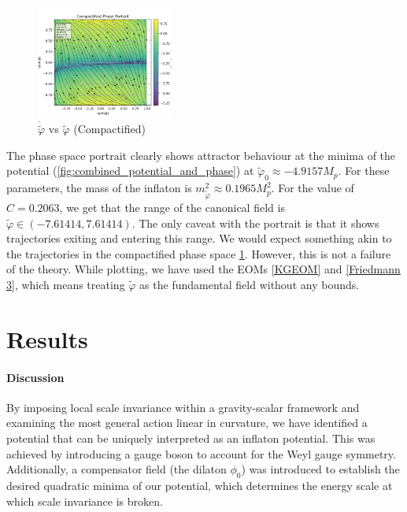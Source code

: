 \documentclass[aps,prd,reprint,preprintnumbers,showpacs,floatfix,nofootinbib,superscript address]{revtex4-2}
\begin{document}
\begin{figure}[h!]
    \includegraphics[width=0.4\textwidth]{../../Python/results/phase_compact.png}
    \caption{$\dot{\tilde{\varphi}}$ vs $\tilde{\varphi}$ (Compactified)}
    \label{Optimized Compact Phase Space potrait1}
\end{figure}


The phase space portrait clearly shows attractor behaviour at the minima of the potential (\cref{fig:combined_potential_and_phase}) at $\tilde{\varphi}_0 \approx -4.9157 M_p$. For these parameters, the mass of the inflaton is $m_{\tilde{\varphi}}^2 \approx  0.1965 M_p^2$. For the value of $C = 0.2063$, we get that the range of the canonical field is $\tilde{\varphi} \in (-7.61414,7.61414)$. The only caveat with the portrait is that it shows trajectories exiting and entering this range. We would expect something akin to the trajectories in the compactified phase space \cref{Optimized Compact Phase Space potrait1}. However, this is not a failure of the theory. While plotting, we have used the EOMs \cref{KGEOM} and \cref{Friedmann 3}, which means treating $\tilde{\varphi}$ as the fundamental field without any bounds.

\section{Results}
\paragraph*{Discussion}
 By imposing local scale invariance within a gravity-scalar framework and examining the most general action linear in curvature, we have identified a potential that can be uniquely interpreted as an inflaton potential. This was achieved by introducing a gauge boson to account for the Weyl gauge symmetry. Additionally, a compensator field (the dilaton $\phi_0$) was introduced to establish the desired quadratic minima of our potential, which determines the energy scale at which scale invariance is broken. 
 
\end{document}
